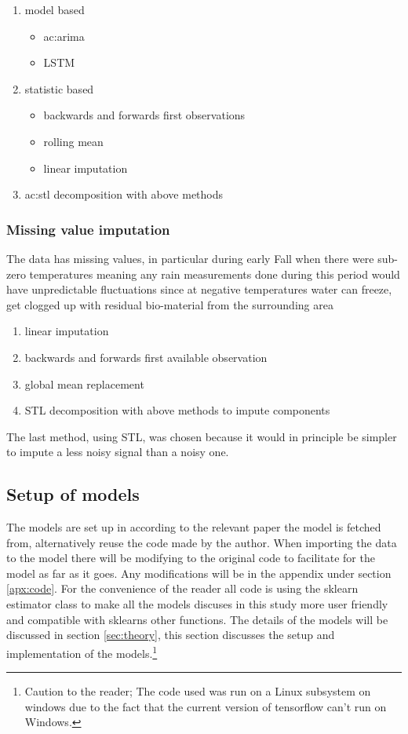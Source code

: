 \begin{enumerate}
	\item model based
	\begin{itemize}
		\item \acrfull{ac:arima}
		\item LSTM
	\end{itemize}
	\item statistic based
	\begin{itemize}
		\item backwards and forwards first observations
		\item rolling mean
		\item linear imputation
	\end{itemize}
	\item \acrshort{ac:stl} decomposition with above methods
\end{enumerate}

\subsubsection{Missing value imputation}

The data has missing values, in particular during early Fall when there were sub-zero temperatures meaning any rain measurements done during this period would have unpredictable fluctuations since at negative temperatures water can freeze, get clogged up with residual bio-material from the surrounding area

\begin{enumerate}
	\item linear imputation
	\item backwards and forwards first available observation
	\item global mean replacement
	\item STL decomposition with above methods to impute components
\end{enumerate}

The last method, using STL, was chosen because it would in principle be simpler to impute a less noisy signal than a noisy one.

\subsection{Setup of models}

The models are set up in according to the relevant paper the model is fetched from, alternatively reuse the code made by the author. When importing the data to the model there will be modifying to the original code to facilitate for the model as far as it goes. Any modifications will be in the appendix under section \ref{apx:code}. For the convenience of the reader all code is using the sklearn estimator class to make all the models discuses in this study more user friendly and compatible with sklearns other functions. The details of the models will be discussed in section \ref{sec:theory}, this section discusses the setup and implementation of the models.\footnote{Caution to the reader; The code used was run on a Linux subsystem on windows due to the fact that the current version of tensorflow can't run on Windows.}

